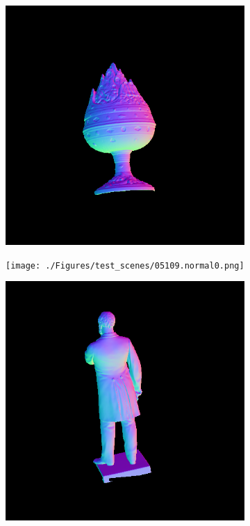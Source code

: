 \documentclass[border=15pt, multi, tikz]{article}
\begin{document}
\begin{figure}[H]
	\centering
	
		\begin{subfigure}[b]{0.18\linewidth}
		\includegraphics[width=\linewidth]{./Figures/test_scenes/05051.normal0.png}
	\end{subfigure}
	\begin{subfigure}[b]{0.18\linewidth}
		\texttt{[image: ./Figures/test\_scenes/05109.normal0.png]}
	\end{subfigure}
	\begin{subfigure}[b]{0.18\linewidth}
		\includegraphics[width=\linewidth]{./Figures/test_scenes/05111.normal0.png}

\end{subfigure}
\end{figure}
\end{document}
